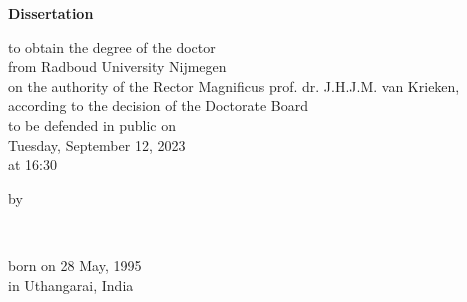 \begin{titlepage}
    \begin{center}


        \vspace*{2\bigskipamount}

        {\makeatletter
            \titlestyle\bfseries\LARGE\@title
            \makeatother}

        {\makeatletter
            \ifx\@subtitle\undefined\else
                \bigskip
                \titlefont\titleshape\Large\@subtitle
            \fi
            \makeatother}

        \vfill


        {\Large\titlefont\bfseries Dissertation}

        \bigskip
        \bigskip

        to obtain the degree of the doctor\\
        from Radboud University Nijmegen\\
        on the authority of the Rector Magnificus prof. dr. J.H.J.M. van Krieken,\\
        according to the decision of the Doctorate Board\\
        to be defended in public on\\

        \bigskip
        Tuesday, September 12, 2023\\
        at 16:30
        \bigskip
        \bigskip

        by

        \bigskip
        \bigskip

        \makeatletter
        {\Large\titlefont\bfseries\@firstnames\ \@lastname}
        \makeatother

        \bigskip
        \bigskip

        born on 28 May, 1995\\
        in Uthangarai, India\\

        \vspace*{2\bigskipamount}


\end{center}
\end{titlepage}
